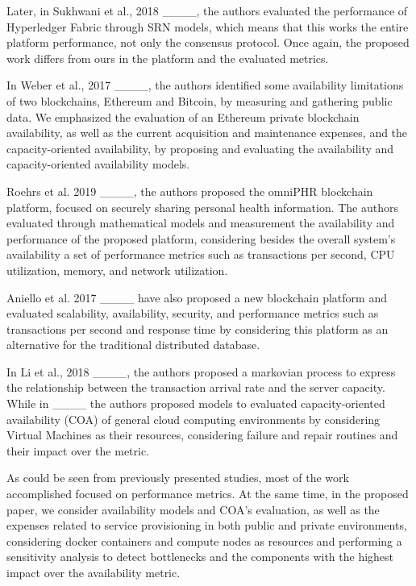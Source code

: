 Later, in Sukhwani et al., 2018 ____, the authors evaluated the performance of Hyperledger Fabric through SRN models, which means that this works the entire platform performance, not only the consensus protocol. Once again, the proposed work differs from ours in the platform and the evaluated metrics. 

In Weber et al., 2017 ____, the authors identified some availability limitations of two blockchains, Ethereum and Bitcoin, by measuring and gathering public data. We emphasized the evaluation of an Ethereum private blockchain availability, as well as the current acquisition and maintenance expenses, and the capacity-oriented availability, by proposing and evaluating the availability and capacity-oriented availability models. 

Roehrs et al. 2019 ____, the authors proposed the omniPHR blockchain platform, focused on securely sharing personal health information. The authors evaluated through mathematical models and measurement the availability and performance of the proposed platform, considering besides the overall system's availability a set of performance metrics such as transactions per second, CPU utilization, memory, and network utilization. 

Aniello et al. 2017 ____ have also proposed a new blockchain platform and evaluated scalability, availability, security, and performance metrics such as transactions per second and response time by considering this platform as an alternative for the traditional distributed database.

In Li et al., 2018 ____, the authors proposed a markovian process to express the relationship between the transaction arrival rate and the server capacity. While in ____ the authors proposed models to evaluated capacity-oriented availability (COA) of general cloud computing environments by considering Virtual Machines as their resources, considering failure and repair routines and their impact over the metric. 

As could be seen from previously presented studies, most of the work accomplished focused on performance metrics. At the same time, in the proposed paper, we consider availability models and COA's evaluation, as well as the expenses related to service provisioning in both public and private environments, considering docker containers and compute nodes as resources and performing a sensitivity analysis to detect bottlenecks and the components with the highest impact over the availability metric.
